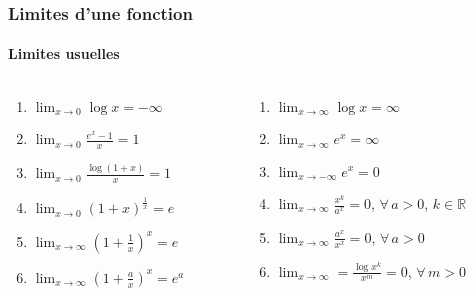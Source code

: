 \documentclass[10pt,notheorems]{beamer}
\theoremstyle{plain}
\theoremstyle{definition} %
\begin{document}
\begin{frame}[fragile]
  \frametitle{Limites d'une fonction}
  \framesubtitle{Limites usuelles}

  \bigskip


  \begin{columns}
    \begin{column}{.5\textwidth}
      \begin{enumerate}
      \item $\lim_{x\rightarrow 0}\log x = -\infty$
      \item $\lim_{x\rightarrow 0}\frac{e^x-1}{x} = 1$
      \item $\lim_{x\rightarrow 0}\frac{\log(1+x)}{x} = 1$
      \item $\lim_{x\rightarrow 0} \left(1+x\right)^{\frac{1}{x}} = e$
      \item $\lim_{x\rightarrow\infty}\left(1+\frac{1}{x}\right)^x = e$
      \item $\lim_{x\rightarrow\infty}\left(1+\frac{a}{x}\right)^x = e^a$
      \end{enumerate}
      \setcounter{enumcounter}{\value{enumi}}
    \end{column}
    \begin{column}{.5\textwidth}
      \begin{enumerate}
        \setcounter{enumi}{\value{enumcounter}}
      \item $\lim_{x\rightarrow \infty}\log x = \infty$
      \item $\lim_{x\rightarrow \infty}e^x = \infty$
      \item $\lim_{x\rightarrow -\infty}e^x = 0$
      \item $\lim_{x\rightarrow\infty}\frac{x^k}{a^x} = 0$, $\forall\, a>0$, $k\in \mathbb R$
      \item $\lim_{x\rightarrow\infty}\frac{a^x}{x^x} = 0$, $\forall\, a>0$
      \item $\lim_{x\rightarrow\infty} = \frac{\log x^k}{x^m} = 0$, $\forall\, m>0$
      \end{enumerate}
    \end{column}
  \end{columns}

\end{frame}
\end{document}
